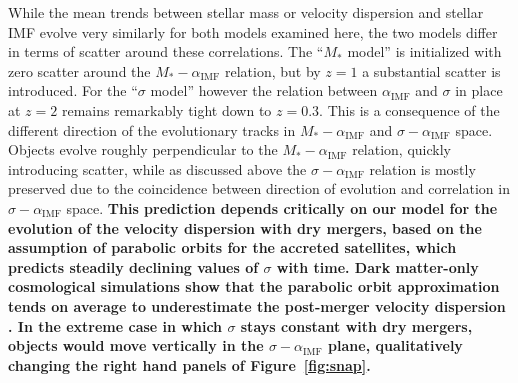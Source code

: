 \documentclass[usenatbib, letters]{mnras}
\def\aimf{\alpha_{\mathrm{IMF}}}
\def\Fref#1{Figure~\ref{#1}\xspace}
\begin{document}
While the mean trends between stellar mass or velocity dispersion and stellar IMF evolve very similarly for both models examined here, the two models differ in terms of scatter around these correlations.
The ``$M_*$ model'' is initialized with zero scatter around the $M_*-\aimf$ relation, but by $z=1$ a substantial scatter is introduced.
For the ``$\sigma$ model'' however the relation between $\aimf$ and $\sigma$ in place at $z=2$ remains remarkably tight down to $z=0.3$.
This is a consequence of the different direction of the evolutionary tracks in $M_*-\aimf$ and $\sigma-\aimf$ space. Objects evolve roughly perpendicular to the $M_*-\aimf$ relation, quickly introducing scatter, while as discussed above the $\sigma-\aimf$ relation is mostly preserved due to the coincidence between direction of evolution and correlation in $\sigma-\aimf$ space.
{\bf 
This prediction depends critically on our model for the evolution of the velocity dispersion with dry mergers, based on the assumption of parabolic orbits for the accreted satellites, which predicts steadily declining values of $\sigma$ with time. 
Dark matter-only cosmological simulations show that the parabolic orbit approximation tends on average to underestimate the post-merger velocity dispersion \citep{Pos++14}.
In the extreme case in which $\sigma$ stays constant with dry mergers, objects would move vertically in the $\sigma-\aimf$ plane, qualitatively changing the right hand panels of \Fref{fig:snap}.
}
\end{document}
